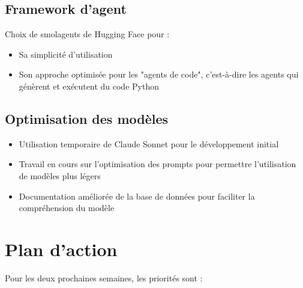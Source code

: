 \documentclass[12pt]{article}
\begin{document}
\subsection{Framework d'agent}
Choix de smolagents de Hugging Face pour :
\begin{itemize}
    \item Sa simplicité d'utilisation
    \item Son approche optimisée pour les "agents de code", c'est-à-dire les agents qui génèrent et exécutent du code Python
\end{itemize}

\subsection{Optimisation des modèles}
\begin{itemize}
    \item Utilisation temporaire de Claude Sonnet pour le développement initial
    \item Travail en cours sur l'optimisation des prompts pour permettre l'utilisation de modèles plus légers
    \item Documentation améliorée de la base de données pour faciliter la compréhension du modèle
\end{itemize}

\section{Plan d'action}

Pour les deux prochaines semaines, les priorités sont :
\end{document}
